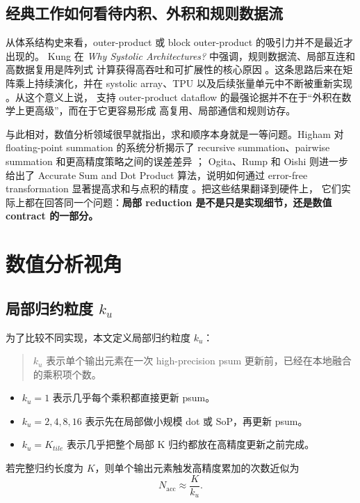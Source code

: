 \documentclass[UTF8,11pt,a4paper]{ctexart}
\newcommand{\ku}{\ensuremath{k_u}}
\begin{document}
\subsection{经典工作如何看待内积、外积和规则数据流}

从体系结构史来看，outer-product 或 block outer-product 的吸引力并不是最近才出现的。
Kung 在 \emph{Why Systolic Architectures?} 中强调，规则数据流、局部互连和高数据复用是阵列式
计算获得高吞吐和可扩展性的核心原因 \cite{kung1982}。这条思路后来在矩阵乘上持续演化，并在
systolic array、TPU 以及后续张量单元中不断被重新实现 \cite{tpu,eyeriss}。从这个意义上说，
支持 outer-product dataflow 的最强论据并不在于“外积在数学上更高级”，而在于它更容易形成
高复用、局部通信和规则访存。

与此相对，数值分析领域很早就指出，求和顺序本身就是一等问题。Higham 对 floating-point summation
的系统分析揭示了 recursive summation、pairwise summation 和更高精度策略之间的误差差异 \cite{higham}；
Ogita、Rump 和 Oishi 则进一步给出了 Accurate Sum and Dot Product 算法，说明如何通过
error-free transformation 显著提高求和与点积的精度 \cite{ogita2005}。把这些结果翻译到硬件上，
它们实际上都在回答同一个问题：\textbf{局部 reduction 是不是只是实现细节，还是数值 contract 的一部分。}

\section{数值分析视角}

\subsection{局部归约粒度 \ku}

为了比较不同实现，本文定义局部归约粒度 \ku{}：
\begin{quote}
  \ku{} 表示单个输出元素在一次 high-precision psum 更新前，已经在本地融合的乘积项个数。
\end{quote}

\begin{itemize}
  \item $\ku=1$ 表示几乎每个乘积都直接更新 psum。
  \item $\ku=2,4,8,16$ 表示先在局部做小规模 dot 或 SoP，再更新 psum。
  \item $\ku=K_{tile}$ 表示几乎把整个局部 K 归约都放在高精度更新之前完成。
\end{itemize}

若完整归约长度为 $K$，则单个输出元素触发高精度累加的次数近似为
\begin{equation}
N_{\text{acc}} \approx \frac{K}{\ku}.
\end{equation}
\end{document}
